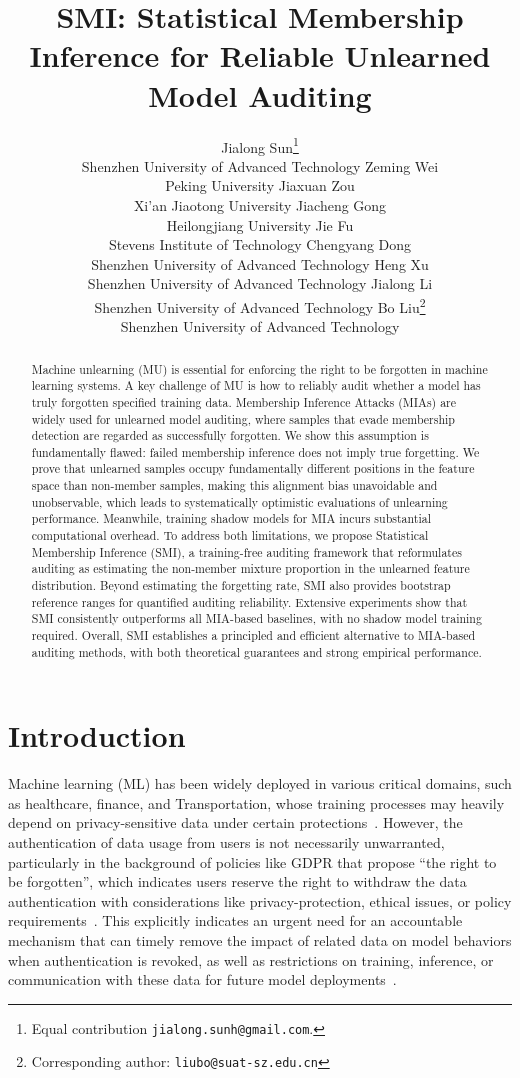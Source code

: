 \documentclass{article}
\title{SMI: Statistical Membership Inference for Reliable Unlearned Model Auditing}
\author{
Jialong Sun\thanks{Equal contribution \texttt{jialong.sunh@gmail.com}.}\\
Shenzhen University of Advanced Technology
\And
Zeming Wei\footnotemark[1]\\
Peking University
\And
Jiaxuan Zou\footnotemark[1]\\
Xi'an Jiaotong University
\And
Jiacheng Gong\\
Heilongjiang University
\And
Jie Fu\\
Stevens Institute of Technology
\And
Chengyang Dong\\
Shenzhen University of Advanced Technology
\And
Heng Xu\\
Shenzhen University of Advanced Technology
\And
Jialong Li\\
Shenzhen University of Advanced Technology
\And
Bo Liu\thanks{Corresponding author: \texttt{liubo@suat-sz.edu.cn}}\\
Shenzhen University of Advanced Technology
}
\theoremstyle{plain}
\theoremstyle{definition}
\theoremstyle{remark}
\begin{document}
\maketitle

\begin{abstract}
Machine unlearning (MU) is essential for enforcing the right to be forgotten in machine learning systems. A key challenge of MU is how to reliably audit whether a model has truly forgotten specified training data. Membership Inference Attacks (MIAs) are widely used for unlearned model auditing, where samples that evade membership detection are regarded as successfully forgotten. We show this assumption is fundamentally flawed: failed membership inference does not imply true forgetting. We prove that unlearned samples occupy fundamentally different positions in the feature space than non-member samples, making this alignment bias unavoidable and unobservable, which leads to systematically optimistic evaluations of unlearning performance. Meanwhile, training shadow models for MIA incurs substantial computational overhead. To address both limitations, we propose Statistical Membership Inference (SMI), a training-free auditing framework that reformulates auditing as estimating the non-member mixture proportion in the unlearned feature distribution. Beyond estimating the forgetting rate, SMI also provides bootstrap reference ranges for quantified auditing reliability. Extensive experiments show that SMI consistently outperforms all MIA-based baselines, with no shadow model training required. Overall, SMI establishes a principled and efficient alternative to MIA-based auditing methods, with both theoretical guarantees and strong empirical performance.
\end{abstract}
\section{Introduction}



Machine learning (ML) has been widely deployed in various critical domains, such as healthcare, finance, and Transportation, whose training processes may heavily depend on privacy-sensitive data under certain protections~\cite{Jeffsafty,Liusafty}. However, the authentication of data usage from users is not necessarily unwarranted, particularly in the background of policies like GDPR that propose ``the right to be forgotten'', which indicates users reserve the right to withdraw the data authentication with considerations like privacy-protection, ethical issues, or policy requirements~\cite{unlearningN,unlearningS,Yisafty,newunlearning}. This explicitly indicates an urgent need for an accountable mechanism that can timely remove the impact of related data on model behaviors when authentication is revoked, as well as restrictions on training, inference, or communication with these data for future model deployments~\cite{unlearningnunix}.
\end{document}
